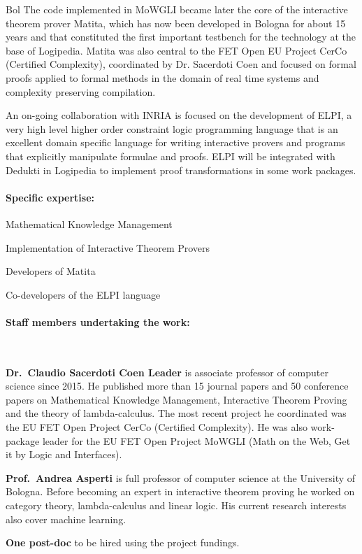\begin{sitedescription}{Bol}
The code implemented in MoWGLI became later the core of the interactive theorem prover Matita, which has now been developed in Bologna for about 15 years and that constituted the first important testbench for the technology at the base of Logipedia. Matita was also central to the FET Open EU Project CerCo (Certified Complexity), coordinated by Dr. Sacerdoti Coen and focused on formal proofs applied to formal methods in the domain of real time systems and complexity preserving compilation.

An on-going collaboration with INRIA is focused on the development of ELPI, a very high level higher order constraint logic programming language that is an excellent domain specific language for writing interactive provers and programs that explicitly manipulate formulae and proofs. ELPI will be integrated with Dedukti in Logipedia to implement proof transformations in some work packages.

\paragraph{Specific expertise:}

\begin{compactitem}
\item Mathematical Knowledge Management
\item Implementation of Interactive Theorem Provers
\item Developers of Matita
\item Co-developers of the ELPI language
\end{compactitem}

\paragraph{Staff members undertaking the work:}~

\textbf{Dr.\ Claudio Sacerdoti Coen Leader} is associate professor of computer science since 2015. He published more than 15 journal papers and 50 conference papers on Mathematical Knowledge Management, Interactive Theorem Proving and the theory of lambda-calculus. The most recent project he coordinated was the EU FET Open Project CerCo (Certified Complexity). He was also work-package leader for the EU FET Open Project MoWGLI (Math on the Web, Get it by Logic and Interfaces).

\textbf{Prof.\ Andrea Asperti} is full professor of computer science at the University of Bologna. Before becoming an expert in interactive theorem proving he worked on category theory, lambda-calculus and linear logic. His current research interests also cover machine learning.

\textbf{One post-doc} to be hired using the project fundings.


\end{sitedescription}

